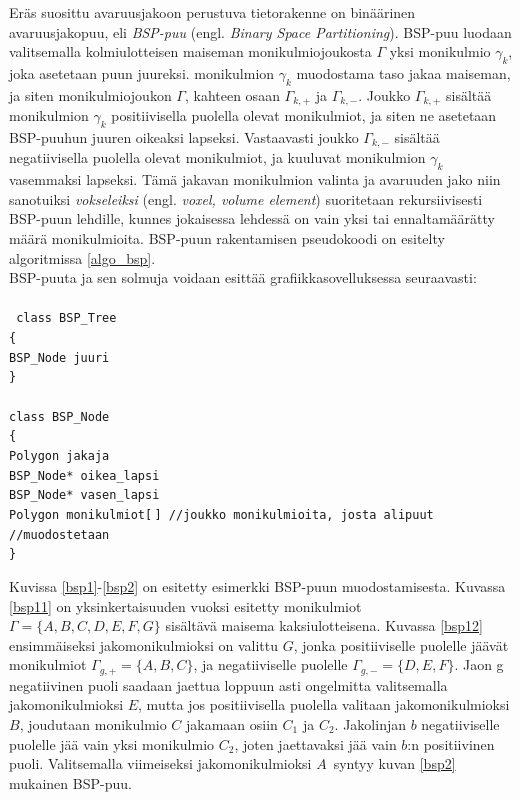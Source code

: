 \documentclass[a4paper, 12pt, titlepage]{article}
\newcommand{\tab}[1][0.5cm]{\hspace*{#1}} %
\newcommand{\code}[1]{\small\texttt{#1}} %
\begin{document}
Eräs suosittu avaruusjakoon perustuva tietorakenne on binäärinen avaruusjakopuu, eli \emph{BSP-puu} (engl. \emph{Binary Space Partitioning}). BSP-puu luodaan valitsemalla kolmiulotteisen maiseman  monikulmiojoukosta $\Gamma$ yksi monikulmio $\gamma_k$, joka asetetaan puun juureksi. monikulmion $\gamma_k$ muodostama taso jakaa maiseman, ja siten monikulmiojoukon $\Gamma$, kahteen osaan $\Gamma_{k,+}$ ja $\Gamma_{k,-}$. Joukko $\Gamma_{k,+}$ sisältää monikulmion $\gamma_k$ positiivisella puolella olevat monikulmiot, ja siten ne asetetaan BSP-puuhun juuren oikeaksi lapseksi. Vastaavasti joukko $\Gamma_{k,-}$ sisältää negatiivisella puolella olevat monikulmiot, ja kuuluvat monikulmion $\gamma_k$ vasemmaksi lapseksi. Tämä jakavan monikulmion valinta ja avaruuden jako niin sanotuiksi \emph{vokseleiksi} (engl. \emph{voxel, volume element}) suoritetaan rekursiivisesti BSP-puun lehdille, kunnes jokaisessa lehdessä on vain yksi tai ennaltamäärätty määrä monikulmioita. \citep[.]{samet} BSP-puun rakentamisen pseudokoodi on esitelty algoritmissa \ref{algo_bsp}.\\

BSP-puuta ja sen solmuja voidaan esittää grafiikkasovelluksessa seuraavasti:\\\\%
\code{
class BSP\_Tree\\
\{\\
\tab BSP\_Node juuri\\
\}\\\\
class BSP\_Node\\
\{\\
\tab Polygon jakaja\\
\tab BSP\_Node* oikea\_lapsi\\
\tab BSP\_Node* vasen\_lapsi\\
\tab Polygon monikulmiot[$\,$] \tab //joukko monikulmioita, josta alipuut\\ 
\hspace*{5.2cm} //muodostetaan\\
\}\\}


\vspace{-0.5cm}

Kuvissa \ref{bsp1}-\ref{bsp2} on esitetty esimerkki BSP-puun muodostamisesta. Kuvassa \ref{bsp11} on yksinkertaisuuden vuoksi esitetty monikulmiot $\Gamma=\{A,B,C,D,E,F,G\}$ sisältävä maisema kaksiulotteisena. Kuvassa \ref{bsp12} ensimmäiseksi jakomonikulmioksi on valittu $G$, jonka positiiviselle puolelle jäävät monikulmiot $\Gamma_{g,+} = \{A,B,C\}$, ja negatiiviselle puolelle $\Gamma_{g,-} = \{D,E,F\}$. Jaon g negatiivinen puoli saadaan jaettua loppuun asti ongelmitta valitsemalla jakomonikulmioksi $E$, mutta jos positiivisella puolella valitaan jakomonikulmioksi $B$, joudutaan monikulmio $C$ jakamaan osiin $C_1$ ja $C_2$. Jakolinjan $b$ negatiiviselle puolelle jää vain yksi monikulmio $C_2$, joten jaettavaksi jää vain $b$:n positiivinen puoli. Valitsemalla viimeiseksi jakomonikulmioksi $A$ syntyy kuvan \ref{bsp2} mukainen BSP-puu.\\
\end{document}
